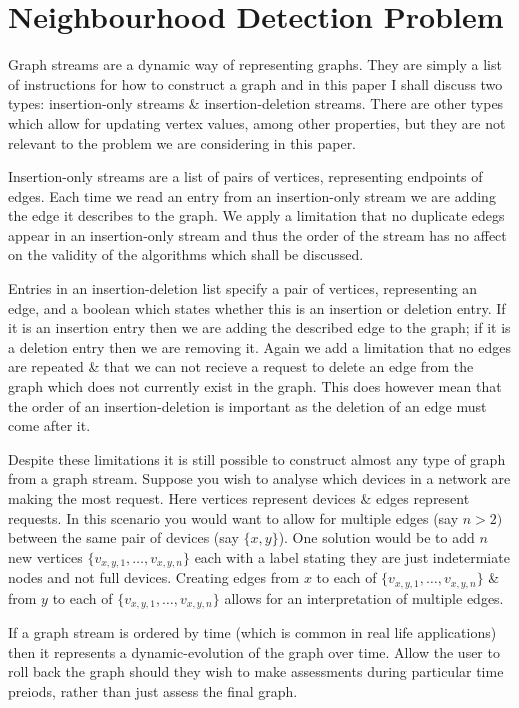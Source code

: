 \documentclass[11pt,twoside,a4paper]{report}
\begin{document}
\section{Neighbourhood Detection Problem}
\par Graph streams are a dynamic way of representing graphs. They are simply a list of instructions for how to construct a graph and in this paper I shall discuss two types: insertion-only streams \& insertion-deletion streams. There are other types which allow for updating vertex values, among other properties, but they are not relevant to the problem we are considering in this paper.
\par Insertion-only streams are a list of pairs of vertices, representing endpoints of edges. Each time we read an entry from an insertion-only stream we are adding the edge it describes to the graph. We apply a limitation that no duplicate edegs appear in an insertion-only stream and thus the order of the stream has no affect on the validity of the algorithms which shall be discussed.
\par Entries in an insertion-deletion list specify a pair of vertices, representing an edge, and a boolean which states whether this is an insertion or deletion entry. If it is an insertion entry then we are adding the described edge to the graph; if it is a deletion entry then we are removing it. Again we add a limitation that no edges are repeated \& that we can not recieve a request to delete an edge from the graph which does not currently exist in the graph. This does however mean that the order of an insertion-deletion is important as the deletion of an edge must come after it.
\par Despite these limitations it is still possible to construct almost any type of graph from a graph stream. Suppose you wish to analyse which devices in a network are making the most request. Here vertices represent devices \& edges represent requests. In this scenario you would want to allow for multiple edges (say $n>2)$ between the same pair of devices (say $\{x,y\}$). One solution would be to add $n$ new vertices $\{v_{x,y,1},\dots,v_{x,y,n}\}$ each with a label stating they are just indetermiate nodes and not full devices. Creating edges from $x$ to each of $\{v_{x,y,1},\dots,v_{x,y,n}\}$ \& from $y$ to each of $\{v_{x,y,1},\dots,v_{x,y,n}\}$ allows for an interpretation of multiple edges.
\par If a graph stream is ordered by time (which is common in real life applications) then it represents a dynamic-evolution of the graph over time. Allow the user to roll back the graph should they wish to make assessments during particular time preiods, rather than just assess the final graph.
\end{document}
